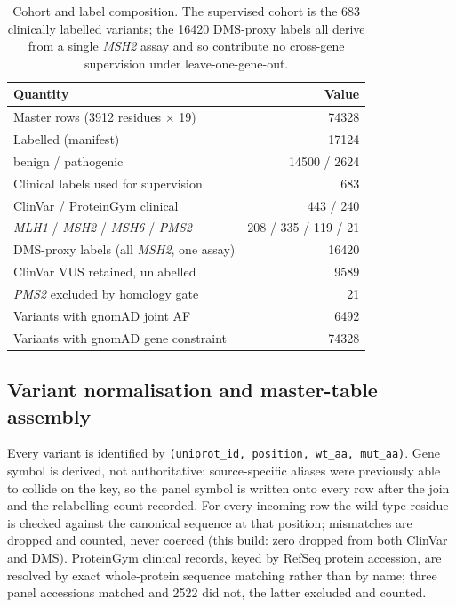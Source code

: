 \documentclass{bioinfo}
\newcommand{\gene}[1]{\textit{#1}}
\begin{document}
\begin{table}[t]
\caption{Cohort and label composition. The supervised cohort is the 683
clinically labelled variants; the \num{16420} DMS-proxy labels all derive from a
single \gene{MSH2} assay and so contribute no cross-gene supervision under
leave-one-gene-out.}
\label{tab:cohort}
\centering
\small
\begin{tabular}{lr}
\toprule
Quantity & Value \\
\midrule
Master rows (\num{3912} residues $\times$ 19) & \num{74328} \\
Labelled (manifest) & \num{17124} \\
\quad benign / pathogenic & \num{14500} / \num{2624} \\
Clinical labels used for supervision & 683 \\
\quad ClinVar / ProteinGym clinical & 443 / 240 \\
\quad \gene{MLH1} / \gene{MSH2} / \gene{MSH6} / \gene{PMS2} & 208 / 335 / 119 / 21 \\
DMS-proxy labels (all \gene{MSH2}, one assay) & \num{16420} \\
ClinVar VUS retained, unlabelled & \num{9589} \\
\gene{PMS2} excluded by homology gate & 21 \\
Variants with gnomAD joint AF & \num{6492} \\
Variants with gnomAD gene constraint & \num{74328} \\
\bottomrule
\end{tabular}
\end{table}

\subsection{Variant normalisation and master-table assembly}

Every variant is identified by
\texttt{(uniprot\_id, position, wt\_aa, mut\_aa)}. Gene symbol is derived, not
authoritative: source-specific aliases were previously able to collide on the
key, so the panel symbol is written onto every row after the join and the
relabelling count recorded. For every incoming row the wild-type residue is
checked against the canonical sequence at that position; mismatches are dropped
and counted, never coerced (this build: zero dropped from both ClinVar and
DMS). ProteinGym clinical records, keyed by RefSeq protein accession, are
resolved by exact whole-protein sequence matching rather than by name; three
panel accessions matched and \num{2522} did not, the latter excluded and
counted.
\end{document}
